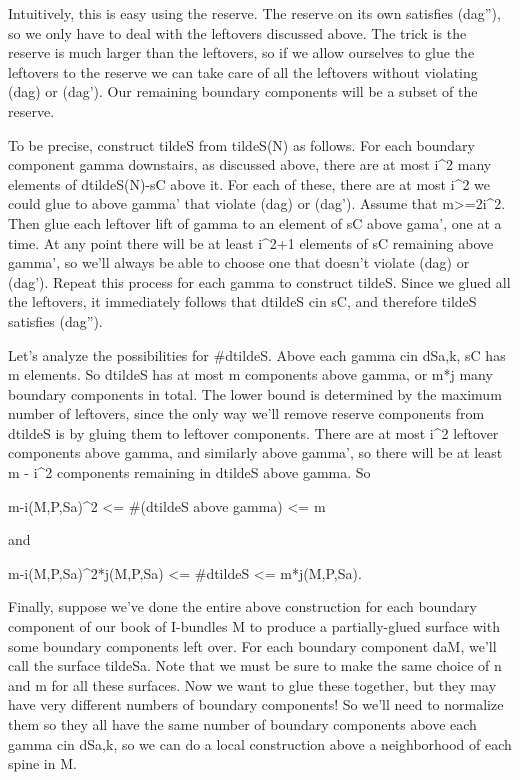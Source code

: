 \documentclass[12pt]{amsart}
\theoremstyle{definition}
\theoremstyle{remark}
\begin{document}
Intuitively, this is easy using the reserve. The reserve on its own satisfies
(dag''), so we only have to deal with the leftovers discussed above.  The trick
is the reserve is much larger than the leftovers, so if we allow ourselves to
glue the leftovers to the reserve we can take care of all the leftovers without
violating (dag) or (dag'). Our remaining boundary components will be a subset
of the reserve.

To be precise, construct tildeS from tildeS(N) as follows. For each boundary
component gamma downstairs, as discussed above, there are at most i^2 many
elements of dtildeS(N)-sC above it. For each of these, there are at most i^2 we
could glue to above gamma' that violate (dag) or (dag').  Assume that m>=2i^2.
Then glue each leftover lift of gamma to an element of sC above gama', one at
a time. At any point there will be at least i^2+1 elements of sC remaining
above gamma', so we'll always be able to choose one that doesn't violate (dag)
or (dag'). Repeat this process for each gamma to construct tildeS.  Since we
glued all the leftovers, it immediately follows that dtildeS cin sC, and
therefore tildeS satisfies (dag'').

Let's analyze the possibilities for #dtildeS. Above each gamma cin dSa,k, sC
has m elements. So dtildeS has at most m components above gamma, or m*j many
boundary components in total. The lower bound is determined by the maximum
number of leftovers, since the only way we'll remove reserve components from
dtildeS is by gluing them to leftover components. There are at most i^2
leftover components above gamma, and similarly above gamma', so there will be
at least m - i^2 components remaining in dtildeS above gamma. So

m-i(M,P,Sa)^2 <= #(dtildeS above gamma) <= m

and

m-i(M,P,Sa)^2*j(M,P,Sa) <= #dtildeS <= m*j(M,P,Sa).

Finally, suppose we've done the entire above construction for each boundary
component of our book of I-bundles M to produce a partially-glued surface with
some boundary components left over. For each boundary component daM, we'll call
the surface tildeSa. Note that we must be sure to make the same choice of n and
m for all these surfaces. Now we want to glue these together, but they may have
very different numbers of boundary components! So we'll need to normalize them
so they all have the same number of boundary components above each gamma cin
dSa,k, so we can do a local construction above a neighborhood of each spine in
M.
\end{document}
